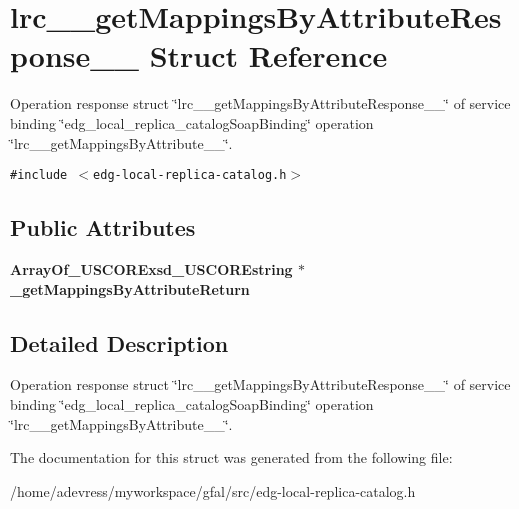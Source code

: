 \section{lrc\_\-\_\-get\-Mappings\-By\-Attribute\-Response\_\-\_\- Struct Reference}
\label{structlrc____getMappingsByAttributeResponse____}
Operation response struct \char`\"{}lrc\_\-\_\-get\-Mappings\-By\-Attribute\-Response\_\-\_\-\char`\"{} of service binding \char`\"{}edg\_\-local\_\-replica\_\-catalog\-Soap\-Binding\char`\"{} operation \char`\"{}lrc\_\-\_\-get\-Mappings\-By\-Attribute\_\-\_\-\char`\"{}.  


{\tt \#include $<$edg-local-replica-catalog.h$>$}

\subsection*{Public Attributes}
\begin{CompactItemize}
\item 
\bf{Array\-Of\_\-USCORExsd\_\-USCOREstring} $\ast$ \textbf{\_\-get\-Mappings\-By\-Attribute\-Return}\label{structlrc____getMappingsByAttributeResponse_____dde66796b0828376ec1644993f4e1d15}

\end{CompactItemize}


\subsection{Detailed Description}
Operation response struct \char`\"{}lrc\_\-\_\-get\-Mappings\-By\-Attribute\-Response\_\-\_\-\char`\"{} of service binding \char`\"{}edg\_\-local\_\-replica\_\-catalog\-Soap\-Binding\char`\"{} operation \char`\"{}lrc\_\-\_\-get\-Mappings\-By\-Attribute\_\-\_\-\char`\"{}. 



The documentation for this struct was generated from the following file:\begin{CompactItemize}
\item 
/home/adevress/myworkspace/gfal/src/edg-local-replica-catalog.h\end{CompactItemize}
